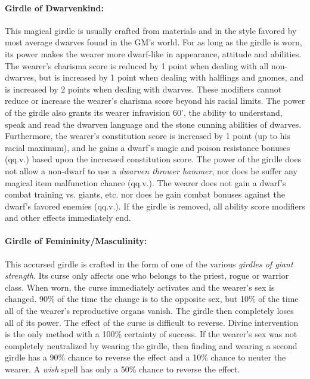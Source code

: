 \begin{multicols}{2}
\paragraph{Girdle of Dwarvenkind:} This magical girdle is usually crafted from materials and in the style favored by most average dwarves found in the GM's world.  For as long as the girdle is worn, its power makes the wearer more dwarf-like in appearance, attitude and abilities.  The wearer's charisma score is reduced by 1 point when dealing with all non-dwarves, but is increased by 1 point when dealing with halflings and gnomes, and is increased by 2 points when dealing with dwarves.  These modifiers cannot reduce or increase the wearer's charisma score beyond his racial limits.  The power of the girdle also grants its wearer infravision 60', the ability to understand, speak and read the dwarven language and the stone cunning abilities of dwarves.  Furthermore, the wearer's constitution score is increased by 1 point (up to his racial maximum), and he gains a dwarf's magic and poison resistance bonuses (qq.v.) based upon the increased constitution score.  The power of the girdle does not allow a non-dwarf to use a \textit{dwarven thrower hammer}, nor does he suffer any magical item malfunction chance (qq.v.).  The wearer does not gain a dwarf's combat training vs. giants, etc. nor does he gain combat bonuses against the dwarf's favored enemies (qq.v.).  If the girdle is removed, all ability score modifiers and other effects immediately end.

\paragraph{Girdle of Femininity/Masculinity:} This accursed girdle is crafted in the form of one of the various \textit{girdles of giant strength}.  Its curse only affects one who belongs to the priest, rogue or warrior class.  When worn, the curse immediately activates and the wearer's sex is changed.  90\% of the time the change is to the opposite sex, but 10\% of the time all of the wearer's reproductive organs vanish.  The girdle then completely loses all of its power.  The effect of the curse is difficult to reverse.  Divine intervention is the only method with a 100\% certainty of success.  If the wearer's sex was not completely neutralized by wearing the girdle, then finding and wearing a second girdle has a 90\% chance to reverse the effect and a 10\% chance to neuter the wearer.  A \textit{wish} spell has only a 50\% chance to reverse the effect. 

\end{multicols}

